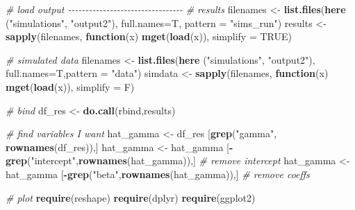 \documentclass[
]{article}
\newenvironment{Shaded}{\begin{snugshade}}{\end{snugshade}}
\newcommand{\AttributeTok}[1]{\textcolor[rgb]{0.13,0.29,0.53}{#1}}
\newcommand{\CommentTok}[1]{\textcolor[rgb]{0.56,0.35,0.01}{\textit{#1}}}
\newcommand{\ConstantTok}[1]{\textcolor[rgb]{0.56,0.35,0.01}{#1}}
\newcommand{\ControlFlowTok}[1]{\textcolor[rgb]{0.13,0.29,0.53}{\textbf{#1}}}
\newcommand{\FunctionTok}[1]{\textcolor[rgb]{0.13,0.29,0.53}{\textbf{#1}}}
\newcommand{\NormalTok}[1]{#1}
\newcommand{\OtherTok}[1]{\textcolor[rgb]{0.56,0.35,0.01}{#1}}
\newcommand{\SpecialCharTok}[1]{\textcolor[rgb]{0.81,0.36,0.00}{\textbf{#1}}}
\newcommand{\StringTok}[1]{\textcolor[rgb]{0.31,0.60,0.02}{#1}}
\begin{document}
{\begin{Shaded}
\begin{Highlighting}[]
\CommentTok{\# load output {-}{-}{-}{-}{-}{-}{-}{-}{-}{-}{-}{-}{-}{-}{-}{-}{-}{-}{-}{-}{-}{-}{-}{-}{-}{-}{-}{-}{-}{-}{-}{-}{-}}
\CommentTok{\# results}
\NormalTok{filenames }\OtherTok{\textless{}{-}} \FunctionTok{list.files}\NormalTok{(}\FunctionTok{here}\NormalTok{ (}\StringTok{"simulations"}\NormalTok{, }\StringTok{"output2"}\NormalTok{), }\AttributeTok{full.names=}\NormalTok{T, }\AttributeTok{pattern =} \StringTok{"sims\_run"}\NormalTok{)}
\NormalTok{results }\OtherTok{\textless{}{-}} \FunctionTok{sapply}\NormalTok{(filenames, }\ControlFlowTok{function}\NormalTok{(x) }\FunctionTok{mget}\NormalTok{(}\FunctionTok{load}\NormalTok{(x)), }\AttributeTok{simplify =} \ConstantTok{TRUE}\NormalTok{)}

\CommentTok{\# simulated data}
\NormalTok{filenames }\OtherTok{\textless{}{-}} \FunctionTok{list.files}\NormalTok{(}\FunctionTok{here}\NormalTok{ (}\StringTok{"simulations"}\NormalTok{, }\StringTok{"output2"}\NormalTok{), }\AttributeTok{full.names=}\NormalTok{T,}\AttributeTok{pattern =} \StringTok{"data"}\NormalTok{)}
\NormalTok{simdata }\OtherTok{\textless{}{-}} \FunctionTok{sapply}\NormalTok{(filenames, }\ControlFlowTok{function}\NormalTok{(x) }\FunctionTok{mget}\NormalTok{(}\FunctionTok{load}\NormalTok{(x)), }\AttributeTok{simplify =}\NormalTok{ F)}

\CommentTok{\# bind}
\NormalTok{df\_res }\OtherTok{\textless{}{-}} \FunctionTok{do.call}\NormalTok{(rbind,results)}

\CommentTok{\# find variables I want}
\NormalTok{hat\_gamma }\OtherTok{\textless{}{-}}\NormalTok{ df\_res [}\FunctionTok{grep}\NormalTok{(}\StringTok{"gamma"}\NormalTok{, }\FunctionTok{rownames}\NormalTok{(df\_res)),]}
\NormalTok{hat\_gamma }\OtherTok{\textless{}{-}}\NormalTok{ hat\_gamma [}\SpecialCharTok{{-}}\FunctionTok{grep}\NormalTok{(}\StringTok{"intercept"}\NormalTok{,}\FunctionTok{rownames}\NormalTok{(hat\_gamma)),] }\CommentTok{\# remove intercept}
\NormalTok{hat\_gamma }\OtherTok{\textless{}{-}}\NormalTok{ hat\_gamma [}\SpecialCharTok{{-}}\FunctionTok{grep}\NormalTok{(}\StringTok{"beta"}\NormalTok{,}\FunctionTok{rownames}\NormalTok{(hat\_gamma)),] }\CommentTok{\# remove coeffs}

\CommentTok{\# plot}
\FunctionTok{require}\NormalTok{(reshape)}
\FunctionTok{require}\NormalTok{(dplyr)}
\FunctionTok{require}\NormalTok{(ggplot2)}


\end{Highlighting}
\end{Shaded}}
\end{document}
